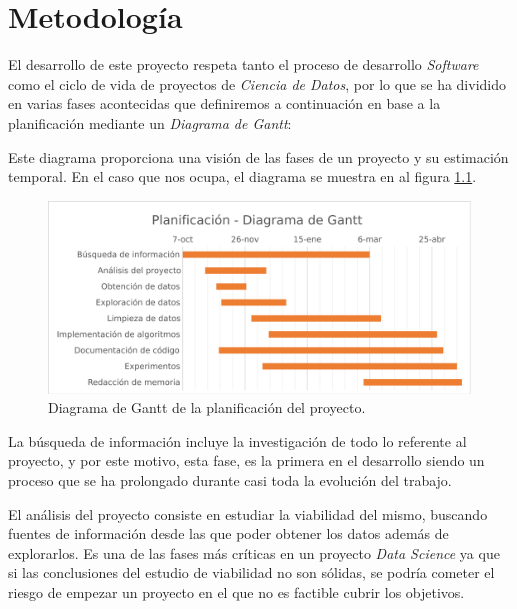 
\chapter{Metodología}
\label{metodologia}

El desarrollo de este proyecto respeta tanto el proceso de desarrollo \textit{Software} como el ciclo de vida de proyectos de \textit{Ciencia de Datos}, por lo que se ha dividido en varias fases acontecidas que definiremos a continuación en base a la planificación mediante un \textit{Diagrama de Gantt}:

Este diagrama proporciona una visión de las fases de un proyecto y su estimación temporal. En el caso que nos ocupa, el diagrama se muestra en al figura \ref{GranttImage}.
\begin{figure}[H]
    \centering
    \includegraphics[width=15cm]{archivos/4.Metodologia/GranttImage}
    \caption{Diagrama de Gantt de la planificación del proyecto.}
    \label{GranttImage}
\end{figure}

La búsqueda de información incluye la investigación de todo lo referente al proyecto, y por este motivo, esta fase, es la primera en el desarrollo siendo un proceso que se ha prolongado durante casi toda la evolución del trabajo.

El análisis del proyecto consiste en estudiar la viabilidad del mismo, buscando fuentes de información desde las que poder obtener los datos además de explorarlos. Es una de las fases más críticas en un proyecto \textit{Data Science} ya que si las conclusiones del estudio de viabilidad no son sólidas, se podría cometer el riesgo de empezar un proyecto en el que no es factible cubrir los objetivos.

